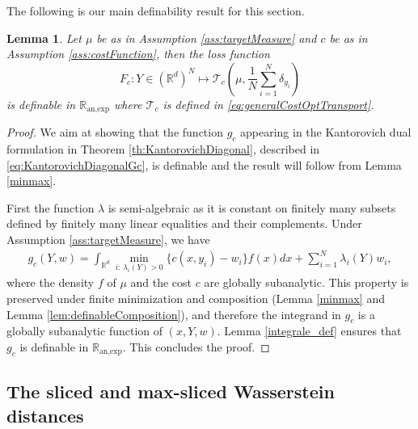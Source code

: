 \documentclass[11pt]{article}
\newcommand{\R}{\mathbb R}
\newcommand{\1}{\mathbbm{1}}
\newtheorem{lem}{Lemma}[section]
\numberwithin{equation}{section}
\begin{document}
The following is our main definability result for this section. 
\begin{lem}\label{Wasserstein definable}
	Let $\mu$ be as in Assumption \ref{ass:targetMeasure} and $c$ be as in Assumption \ref{ass:costFunction}, then the loss function 
	\begin{equation}
		F_{c} : Y\in (\mathbb{R}^{d})^{N}\longmapsto \mathcal{T}_c\left(\mu,\frac{1}{N}\sum_{i=1}^{N}\delta_{y_{i}}\right)
	\end{equation}
	is definable in $\mathbb{R}_{\text{an,exp}}$ where $\mathcal{T}_c$ is defined in \eqref{eq:generalCostOptTransport}.
\end{lem}
\begin{proof}
	We aim at showing that the function $g_c$ appearing in the Kantorovich dual formulation in Theorem \ref{th:KantorovichDiagonal}, described in \eqref{eq:KantorovichDiagonalGc}, is definable and the result will follow from Lemma \ref{minmax}.

	First the function $\lambda$ is semi-algebraic as it is constant on finitely many subsets defined by finitely many linear equalities and their complements. Under Assumption \ref{ass:targetMeasure}, we have
	\begin{align*}
		g_c(Y,w) = \int_{\R^d} \min_{i:\, \lambda_i(Y)>0} \{c(x,y_i) - w_i\} f(x)dx + \sum_{i=1}^N \lambda_i(Y) w_i,
	\end{align*}
	where the density $f$ of $\mu$ and the cost $c$ are globally subanalytic. This property is preserved under finite minimization and composition (Lemma \ref{minmax} and Lemma \ref{lem:definableComposition}), and therefore the integrand in $g_c$ is a globally subanalytic function of $(x,Y,w)$.
	Lemma \ref{integrale_def} ensures that $g_c$ is definable in $\mathbb{R}_{\text{an,exp}}$. This concludes the proof. 
\end{proof}


\subsection{The sliced and max-sliced Wasserstein distances}
\label{sec:sliced_max}
\end{document}
